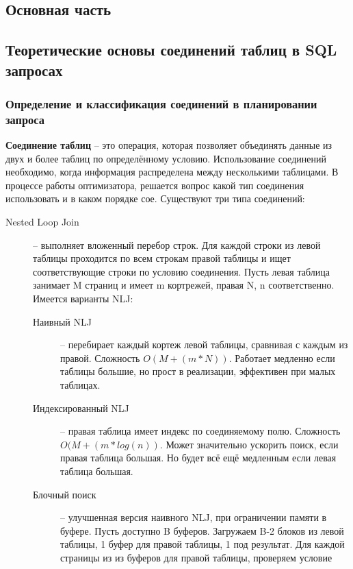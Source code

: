 \documentclass[12pt]{article}
\begin{document}
\begin{flushleft}

\centering \section*{Основная часть}
\centering \subsection*{Теоретические основы соединений таблиц в SQL запросах}
\centering \subsubsection*{Определение и классификация соединений в планировании запроса}
\raggedright
\textbf{Соединение таблиц} -- это операция, которая позволяет объединять данные
из двух и более таблиц по определённому условию. Использование соединений необходимо,
когда информация распределена между несколькими таблицами. В процессе работы оптимизатора,
решается вопрос какой тип соединения использовать и в каком порядке сое. 
Существуют три типа соединений:
\begin{description}
    \item[Nested Loop Join] -- выполняет вложенный перебор строк. 
    Для каждой строки из левой таблицы проходится по всем строкам правой таблицы 
    и ищет соответствующие строки по условию соединения. Пусть левая таблица 
    занимает M страниц и имеет m кортрежей, правая N, n соответственно. Имеется 
    варианты NLJ:
    \begin{description}
        \item[Наивный NLJ] -- перебирает каждый кортеж левой таблицы, 
        сравнивая с каждым из правой. Сложность $O(M+(m*N))$. Работает медленно 
        если таблицы большие, но прост в реализации, эффективен при малых 
        таблицах.
        \item[Индексированный NLJ] -- правая таблица имеет индекс по соединяемому 
        полю. Сложность $O(M+(m*log(n))$. Может значительно ускорить поиск, если 
        правая таблица большая. Но будет всё ещё медленным если левая таблица 
        большая.
        \item[Блочный поиск] -- улучшенная версия наивного NLJ, при
        ограничении памяти в буфере. Пусть доступно B буферов. Загружаем B-2 
        блоков из левой таблицы, 1 буфер для правой таблицы, 1 под результат. 
        Для каждой страницы из из буферов для правой таблицы, проверяем условие 

\end{description}
\end{description}
\end{flushleft}
\end{document}
